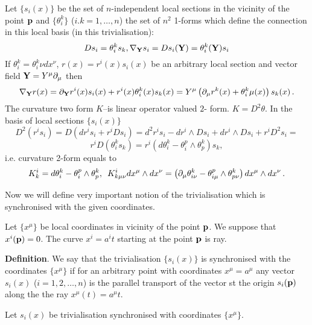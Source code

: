  Let $\{s_i(x)\}$ be the set of $n$-independent local sections in the vicinity of the point ${\bf p}$
 and $\{\theta^k_i\}$ ($i.k=1,\dots,n$) the set of $n^2$ 1-forms which define the connection in this local basis (in this trivialisation):
              $$
         Ds_i=\theta^k_is_k, \nabla_{\bf Y} s_i=Ds_i({\bf Y})=\theta^k_i({\bf Y})s_i
              $$
If $\theta^k_i=\theta^k_i\nu dx^\nu$, $r(x)=r^i(x)s_i(x)$ be an arbitrary local section and vector field ${\bf Y}=Y^\mu\partial_\mu$ then
              $$
   \nabla_{\bf Y} r(x)=\partial_{\bf Y} r^i(x)s_i(x)+r^i(x)\theta_i^k(x)s_k(x)=
   Y^\mu\left(\partial_\mu r^k(x)+\theta^k_i\mu(x)\right)s_k(x)\,.
              $$
The curvature two form $K$--is linear operator valued $2$- form. $K=D^2\theta$. In the basis of local sections $\{s_i(x)\}$
     $$
  D^2(r^is_i)=D\left(dr^is_i+r^iDs_i\right)=d^2r^is_i-dr^i\wedge Ds_i+dr^i\wedge Ds_i+r^iD^2s_i=
     $$
   $$
 r^iD(\theta_i^k s_k)=r^i(d\theta_i^k -\theta_i^p\wedge\theta_p^k )s_k,
   $$
i.e. curvature 2-form equals to
           $$
        K^i_k=d\theta_i^k -\theta_i^p\wedge\theta_p^k ,  \,\,\,
        K^i_{k\mu\nu}dx^\mu \wedge dx^\nu=
          \left(\partial_\mu\theta^k_{i\nu}-\theta_{i\mu}^p\wedge \theta_{p\nu}^k\right)dx^\mu \wedge dx^\nu\,.
           $$



Now we will define very important notion of the
trivialisation which is  synchronised with the given coordinates.



Let $\{x^\mu\}$ be local coordinates in  vicinity of the point ${\bf p}$.
We suppose that $x^i({\bf p})=0$. The curve $x^i=a^it$ starting at the point ${\bf p}$ is ray.

{\bf Definition}.
 We say that the trivialisation $\{s_i(x)\}$ is synchronised with the  coordinates  $\{x^\mu\}$
 if for an arbitrary point with coordinates $x^\mu=a^\mu$ any vector  $s_i(x)$ ($i=1,2,\dots,n$) is the parallel transport of the vector st the origin
  $s_i({\bf p})$ along the  the ray $x^\mu(t)=a^\mu t$.





  Let  ${s_i(x)}$ be  trivialisation synchronised with coordinates $\{x^\mu\}$.

